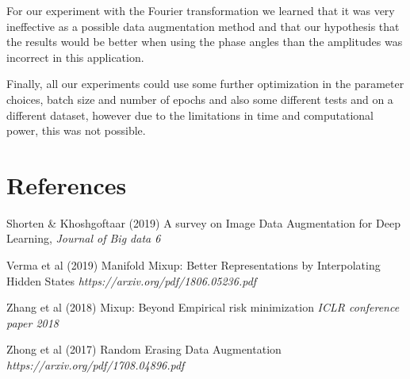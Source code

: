 \documentclass{article}
\begin{document}
For our experiment with the Fourier transformation we learned that it was very ineffective as a possible data augmentation method and that our hypothesis 
that the results would be better when using the phase angles than the amplitudes was incorrect in this application. 

Finally, all our experiments could use some further optimization in the parameter choices, batch size and number of epochs and also some different tests and on a different dataset, however due to the limitations in time and computational power, this was not possible. 

\section*{References}

Shorten \& Khoshgoftaar (2019) A survey on Image Data Augmentation for Deep Learning, \textit{Journal of Big data 6}

Verma et al (2019) Manifold Mixup: Better Representations by Interpolating Hidden States \textit{https://arxiv.org/pdf/1806.05236.pdf}

Zhang et al (2018) Mixup: Beyond Empirical risk minimization \textit{ICLR conference paper 2018}

Zhong et al (2017) Random Erasing Data Augmentation \textit{https://arxiv.org/pdf/1708.04896.pdf}
\end{document}
